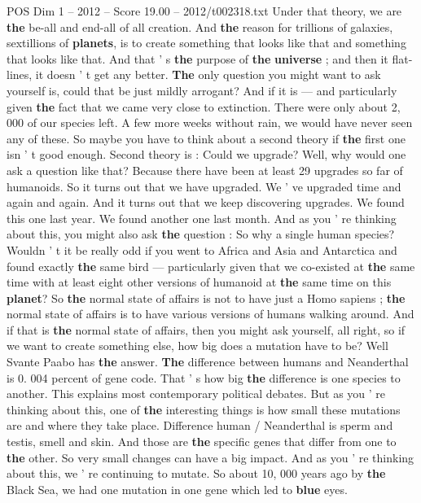 \begin{textsample}{POS Dim 1 – 2012 – Score 19.00 – 2012/t002318.txt}
Under that theory, we are \textbf{the} be-all and end-all of all creation.
And \textbf{the} reason for trillions of galaxies, sextillions of \textbf{planets}, is to create something that looks like that and something that looks like that.
And that ' s \textbf{the} purpose of \textbf{the} \textbf{universe} ; and then it flat-lines, it doesn ' t get any better. \textbf{The} only question you might want to ask yourself is, could that be just mildly arrogant?
And if it is — and particularly given \textbf{the} fact that we came very close to extinction.
There were only about 2, 000 of our species left.
A few more weeks without rain, we would have never seen any of these.
So maybe you have to think about a second theory if \textbf{the} first one isn ' t good enough.
Second theory is : Could we upgrade?
Well, why would one ask a question like that?
Because there have been at least 29 upgrades so far of humanoids.
So it turns out that we have upgraded.
We ' ve upgraded time and again and again.
And it turns out that we keep discovering upgrades.
We found this one last year.
We found another one last month.
And as you ' re thinking about this, you might also ask \textbf{the} question : So why a single human species?
Wouldn ' t it be really odd if you went to Africa and Asia and Antarctica and found exactly \textbf{the} same bird — particularly given that we co-existed at \textbf{the} same time with at least eight other versions of humanoid at \textbf{the} same time on this \textbf{planet}?
So \textbf{the} normal state of affairs is not to have just a Homo sapiens ; \textbf{the} normal state of affairs is to have various versions of humans walking around.
And if that is \textbf{the} normal state of affairs, then you might ask yourself, all right, so if we want to create something else, how big does a mutation have to be?
Well Svante Paabo has \textbf{the} answer. \textbf{The} difference between humans and Neanderthal is 0. 004 percent of gene code.
That ' s how big \textbf{the} difference is one species to another.
This explains most contemporary political debates.
But as you ' re thinking about this, one of \textbf{the} interesting things is how small these mutations are and where they take place.
Difference human / Neanderthal is sperm and testis, smell and skin.
And those are \textbf{the} specific genes that differ from one to \textbf{the} other.
So very small changes can have a big impact.
And as you ' re thinking about this, we ' re continuing to mutate.
So about 10, 000 years ago by \textbf{the} Black Sea, we had one mutation in one gene which led to \textbf{blue} eyes.

\end{textsample}
